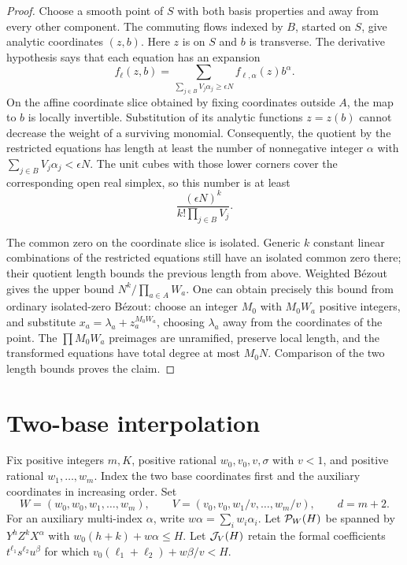\begin{proof}
Choose a smooth point of \(S\) with both basis properties and away
from every other component. The commuting flows indexed by \(B\),
started on \(S\), give analytic coordinates \((z,b)\). Here \(z\)
is on \(S\) and \(b\) is transverse. The derivative hypothesis says
that each equation has an expansion
\[
 f_\ell(z,b)=\sum_{\sum_{j\in B}V_j\alpha_j\geq\epsilon N}
                         f_{\ell,\alpha}(z)b^\alpha.
\]
On the affine coordinate slice obtained by fixing coordinates outside
\(A\), the map to \(b\) is locally invertible. Substitution of its
analytic functions \(z=z(b)\) cannot decrease the weight of a surviving
monomial. Consequently, the quotient by the restricted equations has
length at least the number of nonnegative integer \(\alpha\) with
\(\sum_{j\in B}V_j\alpha_j<\epsilon N\). The unit cubes with those
lower corners cover the corresponding open real simplex, so this number
is at least
\[
                 \frac{(\epsilon N)^k}{k!\prod_{j\in B}V_j}.
\]

The common zero on the coordinate slice is isolated. Generic \(k\)
constant linear combinations of the restricted equations still have
an isolated common zero there; their quotient length bounds the previous
length from above. Weighted B\'ezout gives the upper bound
\(N^k/\prod_{a\in A}W_a\). One can obtain precisely this bound from
ordinary isolated-zero B\'ezout: choose an integer \(M_0\) with
\(M_0W_a\) positive integers, and substitute
\(x_a=\lambda_a+z_a^{M_0W_a}\), choosing \(\lambda_a\) away from the
coordinates of the point. The \(\prod M_0W_a\) preimages are unramified,
preserve local length, and the transformed equations have total degree
at most \(M_0N\). Comparison of the two length bounds proves the claim.
\end{proof}

\section{Two-base interpolation}\label{sec:geometry}

Fix positive integers \(m,K\), positive rational \(w_0,v_0,v,\sigma\) with
\(v<1\), and positive rational \(w_1,\ldots,w_m\). Index the two
base coordinates first and the auxiliary coordinates in increasing order.
Set
\[
 W=(w_0,w_0,w_1,\ldots,w_m),\qquad
 V=(v_0,v_0,w_1/v,\ldots,w_m/v),\qquad d=m+2.
\]
For an auxiliary multi-index \(\alpha\), write
\(w\alpha=\sum_i w_i\alpha_i\). Let \(\mathcal P_W(H)\) be spanned by
\(Y^hZ^kX^\alpha\) with \(w_0(h+k)+w\alpha\leq H\).
Let \(\mathcal J_V(H)\) retain the formal coefficients
\(t^{\ell_1}s^{\ell_2}u^\beta\) for which
\(v_0(\ell_1+\ell_2)+w\beta/v<H\).

